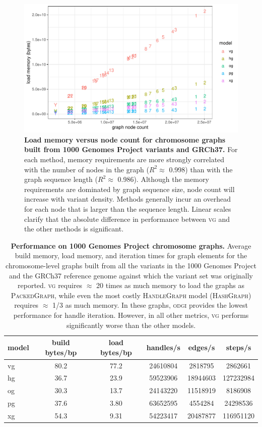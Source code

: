 \documentclass{article}
\begin{document}
\begin{figure}[p]
  \centering
  \includegraphics[width=1.0\textwidth]{figures/1000gp_chroms_node_count.pdf}
  \caption{
    \label{fig:1000GPchroms}
    \textbf{Load memory versus node count for chromosome graphs built from 1000 Genomes Project variants and GRCh37.}
    For each method, memory requirements are more strongly correlated with the number of nodes in the graph ($R^2 \approx$ 0.998) than with the graph sequence length ($R^2 \approx$ 0.986).
    Although the memory requirements are dominated by graph sequence size, node count will increase with variant density.
    Methods generally incur an overhead for each node that is larger than the sequence length.
    Linear scales clarify that the absolute difference in performance between \textsc{vg} and the other methods is significant.
    }
\end{figure}

\begin{table}
  \centering
\begin{tabular}{l||c|c|c|c|c}
model & build bytes/bp & load bytes/bp & handles/s & edges/s & steps/s \\
\hline
vg &   80.2 &   77.2  &   24610804 &    2818795 &     2862661 \\
hg &   36.7 &   23.9  &   59523906 &   18944603 &   127232984 \\
og &   30.3 &   13.7  &   24143220 &   11518919 &     8186908 \\
pg &   37.6 &   3.80  &   63652595 &    4554284 &    24298536 \\
xg &   54.3 &   9.31  &   54223417 &   20487877 &   116951120 \\
\hline
\end{tabular}
\caption{
  \textbf{Performance on 1000 Genomes Project chromosome graphs.}
  Average build memory, load memory, and iteration times for graph elements for the chromosome-level graphs built from all the variants in the 1000 Genomes Project and the GRCh37 reference genome against which the variant set was originally reported.
  \textsc{vg} requires $\approx$ 20 times as much memory to load the graphs as \textsc{PackedGraph}, while even the most costly \textsc{HandleGraph} model (\textsc{HashGraph}) requires $\approx$ 1/3 as much memory.
  In these graphs, \textsc{odgi} provides the lowest performance for handle iteration.
  However, in all other metrics, \textsc{vg} performs significantly worse than the other models.
}
\label{table:1000GPchroms}
\end{table}
\end{document}
